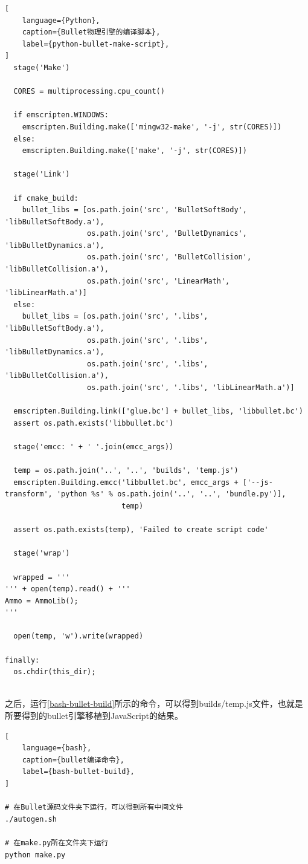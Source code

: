 \begin{lstlisting}[
    language={Python},
    caption={Bullet物理引擎的编译脚本},
    label={python-bullet-make-script},
]
  stage('Make')

  CORES = multiprocessing.cpu_count()

  if emscripten.WINDOWS:
    emscripten.Building.make(['mingw32-make', '-j', str(CORES)])
  else:
    emscripten.Building.make(['make', '-j', str(CORES)])

  stage('Link')

  if cmake_build:
    bullet_libs = [os.path.join('src', 'BulletSoftBody', 'libBulletSoftBody.a'),
                   os.path.join('src', 'BulletDynamics', 'libBulletDynamics.a'),
                   os.path.join('src', 'BulletCollision', 'libBulletCollision.a'),
                   os.path.join('src', 'LinearMath', 'libLinearMath.a')]
  else:
    bullet_libs = [os.path.join('src', '.libs', 'libBulletSoftBody.a'),
                   os.path.join('src', '.libs', 'libBulletDynamics.a'),
                   os.path.join('src', '.libs', 'libBulletCollision.a'),
                   os.path.join('src', '.libs', 'libLinearMath.a')]

  emscripten.Building.link(['glue.bc'] + bullet_libs, 'libbullet.bc')
  assert os.path.exists('libbullet.bc')

  stage('emcc: ' + ' '.join(emcc_args))

  temp = os.path.join('..', '..', 'builds', 'temp.js')
  emscripten.Building.emcc('libbullet.bc', emcc_args + ['--js-transform', 'python %s' % os.path.join('..', '..', 'bundle.py')],
                           temp)

  assert os.path.exists(temp), 'Failed to create script code'

  stage('wrap')

  wrapped = '''
''' + open(temp).read() + '''
Ammo = AmmoLib();
'''

  open(temp, 'w').write(wrapped)

finally:
  os.chdir(this_dir);


\end{lstlisting}

之后，运行\ref{bash-bullet-build}所示的命令，可以得到builds/temp.js文件，也就是所要得到的bullet引擎移植到JavaScript的结果。

\begin{lstlisting}[
    language={bash},
    caption={bullet编译命令},
    label={bash-bullet-build},
]

# 在Bullet源码文件夹下运行，可以得到所有中间文件
./autogen.sh

# 在make.py所在文件夹下运行
python make.py
\end{lstlisting}



